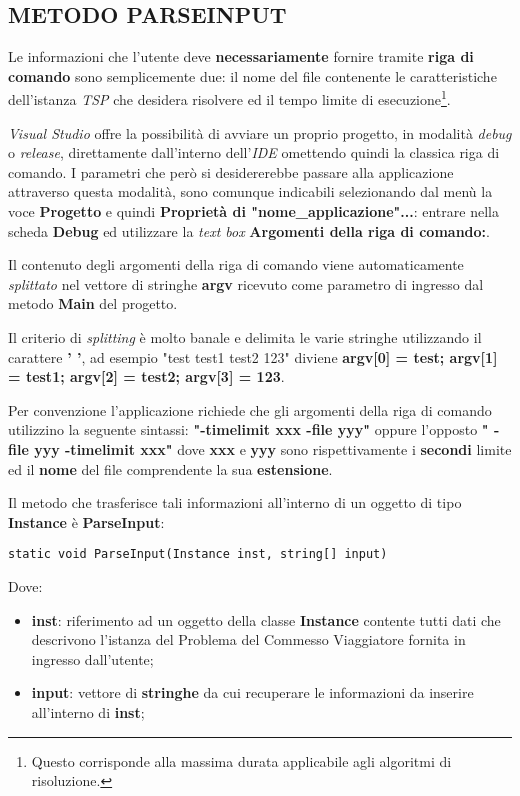 \documentclass[11pt]{article}
\begin{document}
\subsection*{METODO PARSEINPUT}
\label{sec:LetturaInputS}

Le informazioni che l'utente deve \textbf{necessariamente} fornire tramite \textbf{riga di comando} sono semplicemente due: il nome del file contenente le caratteristiche dell'istanza \textit{TSP} che desidera risolvere ed il tempo limite di esecuzione\footnote{Questo corrisponde alla massima durata applicabile agli algoritmi di risoluzione.}.

\textit{Visual Studio} offre la possibilità di avviare un proprio progetto, in modalità \textit{debug} o \textit{release}, direttamente dall'interno dell'\textit{IDE} omettendo quindi la classica riga di comando. I parametri che però si desidererebbe passare alla applicazione attraverso questa modalità, sono comunque indicabili selezionando dal menù la voce \textbf{Progetto} e quindi \textbf{Proprietà di "nome\_applicazione"...}: entrare nella scheda \textbf{Debug} ed utilizzare la \textit{text box} \textbf{Argomenti della riga di comando:}.

Il contenuto degli argomenti della riga di comando viene automaticamente \textit{splittato} nel vettore di stringhe \textbf{argv} ricevuto come parametro di ingresso dal metodo \textbf{Main} del progetto.

Il criterio di \textit{splitting} è molto banale e delimita le varie stringhe utilizzando il carattere \textbf{' '}, ad esempio "test test1 test2 123" diviene \textbf{argv[0] = test; argv[1] = test1; argv[2] = test2; argv[3] = 123}.

Per convenzione l'applicazione richiede che gli argomenti della riga di comando utilizzino la seguente sintassi: \textbf{"-timelimit xxx -file yyy"} oppure l'opposto \textbf{" -file yyy -timelimit xxx"} dove \textbf{xxx} e \textbf{yyy} sono rispettivamente i \textbf{secondi} limite ed il \textbf{nome} del file comprendente la sua \textbf{estensione}.

Il metodo che trasferisce tali informazioni all'interno di un oggetto di tipo \textbf{Instance} è \textbf{ParseInput}:

\begin{lstlisting}
static void ParseInput(Instance inst, string[] input)
\end{lstlisting}

Dove:

\begin{itemize}
\item \textbf{inst}: riferimento ad un oggetto della classe \textbf{Instance} contente tutti dati che descrivono l'istanza del Problema del Commesso Viaggiatore fornita in ingresso dall'utente;
\item \textbf{input}: vettore di \textbf{stringhe} da cui recuperare le informazioni da inserire all'interno di \textbf{inst};
\end{itemize}
\end{document}
